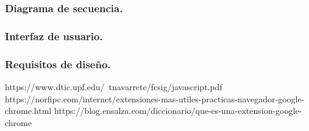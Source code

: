\documentclass[12pt, a4paper, titlepage]{article}
\begin{document}
			\subsubsection{Diagrama de secuencia.}
			\subsubsection{Interfaz de usuario.}
			\subsubsection{Requisitos de diseño.}
	\begin{thebibliography}{20}
		 https://www.dtic.upf.edu/~tnavarrete/fcsig/javascript.pdf 
		https://norfipc.com/internet/extensiones-mas-utiles-practicas-navegador-google-chrome.html
		https://blog.ensalza.com/diccionario/que-es-una-extension-google-chrome
	\end{thebibliography}		
\end{document}
